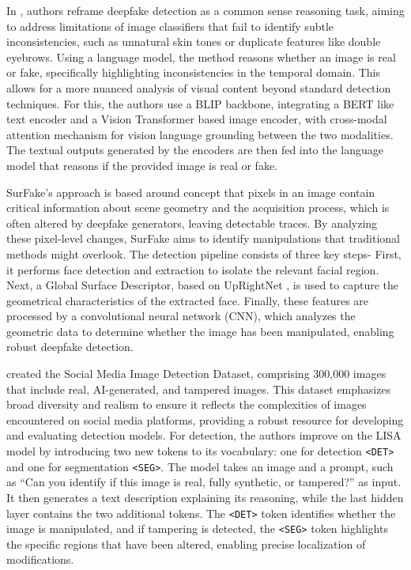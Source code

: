 \documentclass[10pt,twocolumn,letterpaper]{article}
\begin{document}
In \cite{zhangCommonSenseReasoning2025}, authors reframe deepfake detection as a common sense reasoning task, aiming to address limitations of image classifiers that fail to identify subtle inconsistencies, such as unnatural skin tones or duplicate features like double eyebrows. Using a language model, the method reasons whether an image is real or fake, specifically highlighting inconsistencies in the temporal domain. This allows for a more nuanced analysis of visual content beyond standard detection techniques. For this, the authors use a BLIP \cite{liBLIPBootstrappingLanguageImage2022} backbone, integrating a BERT \cite{devlinBERTPretrainingDeep2019} like text encoder and a Vision Transformer \cite{dosovitskiyImageWorth16x162021} based image encoder, with cross-modal attention mechanism for vision language grounding between the two modalities. The textual outputs generated by the encoders are then fed into the language model that reasons if the provided image is real or fake.

SurFake's \cite{ciamarraDeepfakeDetectionExploiting2024} approach is based around concept that pixels in an image contain critical information about scene geometry and the acquisition process, which is often altered by deepfake generators, leaving detectable traces. By analyzing these pixel-level changes, SurFake aims to identify manipulations that traditional methods might overlook. The detection pipeline consists of three key steps- First, it performs face detection and extraction to isolate the relevant facial region. Next, a Global Surface Descriptor, based on UpRightNet \cite{xianUprightNetGeometryAwareCamera2019}, is used to capture the geometrical characteristics of the extracted face. Finally, these features are processed by a convolutional neural network (CNN), which analyzes the geometric data to determine whether the image has been manipulated, enabling robust deepfake detection.

\cite{huangSIDASocialMedia2025} created the Social Media Image Detection Dataset, comprising 300,000 images that include real, AI-generated, and tampered images. This dataset emphasizes broad diversity and realism to ensure it reflects the complexities of images encountered on social media platforms, providing a robust resource for developing and evaluating detection models. For detection, the authors improve on the LISA \cite{laiLISAReasoningSegmentation2024} model by introducing two new tokens to its vocabulary: one for detection \texttt{<DET>} and one for segmentation \texttt{<SEG>}. The model takes an image and a prompt, such as “Can you identify if this image is real, fully synthetic, or tampered?” as input. It then generates a text description explaining its reasoning, while the last hidden layer contains the two additional tokens. The \texttt{<DET>} token identifies whether the image is manipulated, and if tampering is detected, the \texttt{<SEG>} token highlights the specific regions that have been altered, enabling precise localization of modifications.
\end{document}

